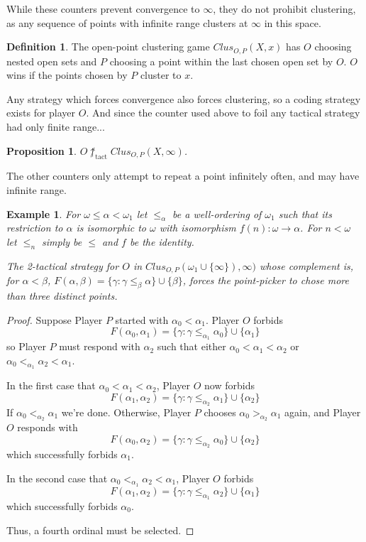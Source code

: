 \documentclass[11pt]{article}
\theoremstyle{plain}
\newtheorem{proposition}[theorem]{Proposition}
\newtheorem{example}[theorem]{Example}
\theoremstyle{definition}
\newtheorem{definition}[theorem]{Definition}
\theoremstyle{remark}
\newcommand{\tactwin}{\uparrow_{\text{tact}}}
\begin{document}
While these counters prevent convergence to $\infty$, they do not prohibit clustering, as any sequence of points with infinite range clusters at $\infty$ in this space.

\begin{definition} 
The open-point clustering game $Clus_{O,P}(X,x)$ has $O$ choosing nested open sets and $P$ choosing a point within the last chosen open set by $O$. $O$ wins if the points chosen by $P$ cluster to $x$.
\end{definition}

Any strategy which forces convergence also forces clustering, so a coding strategy exists for player $O$. And since the counter used above to foil any tactical strategy had only finite range...

\begin{proposition}
$O\not\tactwin Clus_{O,P}(X,\infty)$.
\end{proposition}

The other counters only attempt to repeat a point infinitely often, and may have infinite range.

\begin{example}
For $\omega\leq\alpha<\omega_1$ let $\leq_{\alpha}$ be a well-ordering of $\omega_1$ such that its restriction to $\alpha$ is isomorphic to $\omega$ with isomorphism $f(n):\omega\to\alpha$. For $n<\omega$ let $\leq_n$ simply be $\leq$ and $f$ be the identity. 

The 2-tactical strategy for $O$ in $Clus_{O,P}(\omega_1\cup\{\infty\}),\infty)$ whose complement is, for $\alpha<\beta$, $F(\alpha,\beta)=\{\gamma : \gamma \leq_\beta \alpha \} \cup \{\beta\}$, forces the point-picker to chose more than three distinct points.
\end{example}

\begin{proof}
Suppose Player $P$ started with $\alpha_0<\alpha_1$. Player $O$ forbids \[F(\alpha_0,\alpha_1) = \{\gamma : \gamma \leq_{\alpha_1}\alpha_0\} \cup \{\alpha_1\}\] so Player $P$ must respond with $\alpha_2$ such that either $\alpha_0<\alpha_1<\alpha_2$ or $\alpha_0<_{\alpha_1}\alpha_2<\alpha_1$.

In the first case that $\alpha_0<\alpha_1<\alpha_2$, Player $O$ now forbids \[F(\alpha_1,\alpha_2) = \{\gamma : \gamma \leq_{\alpha_2}\alpha_1\} \cup \{\alpha_2\}\] If $\alpha_0<_{\alpha_2}\alpha_1$ we're done. Otherwise, Player $P$ chooses $\alpha_0>_{\alpha_2}\alpha_1$ again, and Player $O$ responds with \[F(\alpha_0,\alpha_2)=\{\gamma : \gamma \leq_{\alpha_2} \alpha_0 \} \cup \{\alpha_2\}\] which successfully forbids $\alpha_1$.

In the second case that $\alpha_0<_{\alpha_1}\alpha_2<\alpha_1$, Player $O$ forbids \[F(\alpha_1,\alpha_2) = \{\gamma : \gamma \leq_{\alpha_1}\alpha_2\} \cup \{\alpha_1\}\] which successfully forbids $\alpha_0$.

Thus, a fourth ordinal must be selected.
\end{proof}
\end{document}
